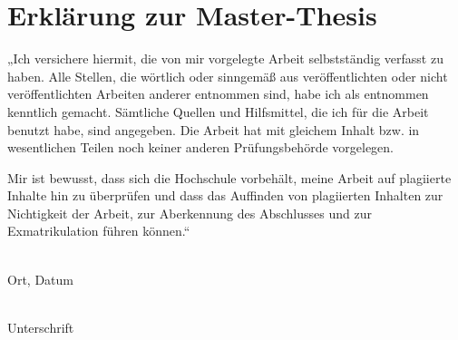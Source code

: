\thispagestyle{empty}
\section*{Erklärung zur Master-Thesis}
„Ich versichere hiermit, die von mir vorgelegte Arbeit selbstständig verfasst zu haben. Alle Stellen, die wörtlich oder sinngemäß aus veröffentlichten oder nicht veröffentlichten Arbeiten anderer entnommen sind, habe ich als entnommen kenntlich gemacht. Sämtliche Quellen und Hilfsmittel, die ich für die Arbeit benutzt habe, sind angegeben. Die Arbeit hat mit gleichem Inhalt bzw. in wesentlichen Teilen noch keiner anderen Prüfungsbehörde vorgelegen.

Mir ist bewusst, dass sich die Hochschule vorbehält, meine Arbeit auf plagiierte Inhalte hin zu überprüfen und dass das Auffinden von plagiierten Inhalten zur Nichtigkeit der Arbeit, zur Aberkennung des Abschlusses und zur Exmatrikulation führen können.“
\vspace{3cm}


\noindent\parbox[t]{5cm}{\underline{\hspace{5cm}}\\\noindent Ort, Datum}%
\hfill%
\noindent\parbox[t]{5cm}{\noindent\underline{\hspace{5cm}}\\\noindent Unterschrift}%
